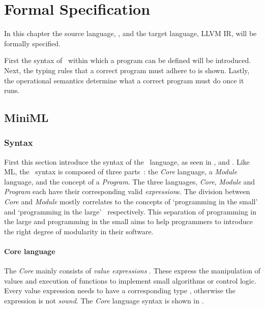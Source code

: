 \chapter{Formal Specification}
\label{chap:formalspecification}
In this chapter the source language, \MiniML, and the target language, LLVM IR, will be formally specified. 

First the syntax of \MiniML\ within which a program can be defined will be introduced.
Next, the typing rules that a correct program must adhere to is shown.
Lastly, the operational semantics determine what a correct program must do once it runs.

\section{MiniML}
\label{sec:MiniMLFormalSpecification}
\subsection{Syntax}
\label{sec:ch2syntax}
First this section introduce the syntax of the \MiniML\ language, as seen in ,  and .
Like ML, the \MiniML\ syntax is composed of three parts~\cite{Milner:1997:DSM:549659}: the \emph{Core} language, a \emph{Module} language, and the concept of a \emph{Program}. 
The three languages, \emph{Core}, \emph{Module} and \emph{Program} each have their corresponding valid \emph{expression}s.
The division between \emph{Core} and \emph{Module} mostly correlates to the concepts of `programming in the small' and `programming in the large'~\cite{Milner:1997:DSM:549659,DeRemer:1975:PLV:390016.808431} respectively.
This separation of programming in the large and programming in the small aims to help programmers to introduce the right degree of modularity in their software.

\subsubsection{Core language}
The \emph{Core} mainly consists of \emph{value expressions} . 
These express the manipulation of values and execution of functions to implement small algorithms or control logic.
Every value expression  needs to have a corresponding type \cmath{\tau}, otherwise the expression is not \emph{sound}.
The \emph{Core} language syntax is shown in .



